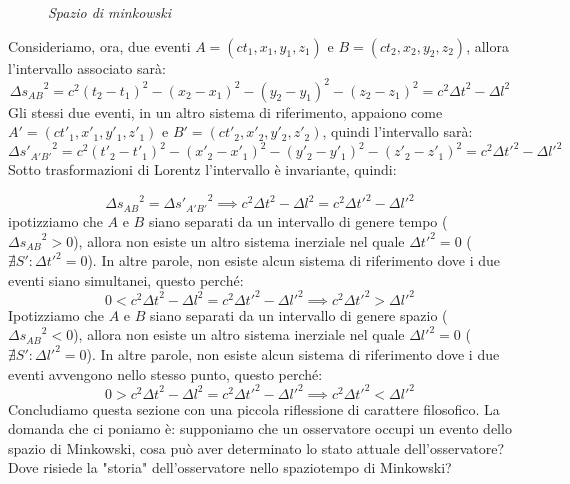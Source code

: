 \begin{figure}[H]
\begin{center}
        \caption{\small \textit{Spazio di minkowski}}
        \label{Fig:SM}
        \end{center}
    \hfill
\end{figure}


Consideriamo, ora, due eventi $A=(ct_1,x_1,y_1,z_1)$ e $B=(ct_2,x_2,y_2,z_2)$, allora l'intervallo associato sarà:
\begin{equation*}
    {\Delta s_{AB}}^2=c^2(t_2-t_1)^2-(x_2-x_1)^2-(y_2-y_1)^2-(z_2-z_1)^2=c^2{\Delta t}^2-{\Delta l}^2
\end{equation*}
Gli stessi due eventi, in un altro sistema di riferimento, appaiono come $A'=(ct'_1,x'_1,y'_1,z'_1)$ e $B'=(ct'_2,x'_2,y'_2,z'_2)$, quindi l'intervallo sarà:
\begin{equation*}
    {\Delta s'_{A'B'}}^2=c^2(t'_2-t'_1)^2-(x'_2-x'_1)^2-(y'_2-y'_1)^2-(z'_2-z'_1)^2=c^2{\Delta t'}^2-{\Delta l'}^2
\end{equation*}
Sotto trasformazioni di Lorentz l'intervallo è invariante, quindi:

\begin{equation*}
    {\Delta s_{AB}}^2= {\Delta s'_{A'B'}}^2 \implies c^2{\Delta t}^2-{\Delta l}^2 =c^2{\Delta t'}^2-{\Delta l'}^2
\end{equation*}
ipotizziamo che $A$ e $B$ siano separati da un intervallo di genere tempo (${\Delta s_{AB}}^2>0$), allora non esiste un altro sistema inerziale nel quale ${\Delta t'}^2=0$ ($\nexists S' :{\Delta t'}^2=0 $). In altre parole, non esiste alcun sistema di riferimento dove i due eventi siano simultanei, questo perché:
\begin{equation*}
  0<c^2{\Delta t}^2-{\Delta l}^2 =c^2{\Delta t'}^2-{\Delta l'}^2 \implies c^2{\Delta t'}^2>{\Delta l'}^2
\end{equation*}
Ipotizziamo che $A$ e $B$ siano separati da un intervallo di genere spazio (${\Delta s_{AB}}^2<0$), allora non esiste un altro sistema inerziale nel quale ${\Delta l'}^2=0$ ($\nexists S' :{\Delta l'}^2=0 $). In altre parole, non esiste alcun sistema di riferimento dove i due eventi avvengono nello stesso punto, questo perché:
\begin{equation*}
  0>c^2{\Delta t}^2-{\Delta l}^2 =c^2{\Delta t'}^2-{\Delta l'}^2 \implies c^2{\Delta t'}^2<{\Delta l'}^2
\end{equation*}
Concludiamo questa sezione con una piccola riflessione di carattere filosofico. La domanda che ci poniamo è: supponiamo che un osservatore occupi un evento dello spazio di Minkowski, cosa può aver determinato lo stato attuale dell'osservatore? Dove risiede la "storia" dell'osservatore nello spaziotempo di Minkowski?

